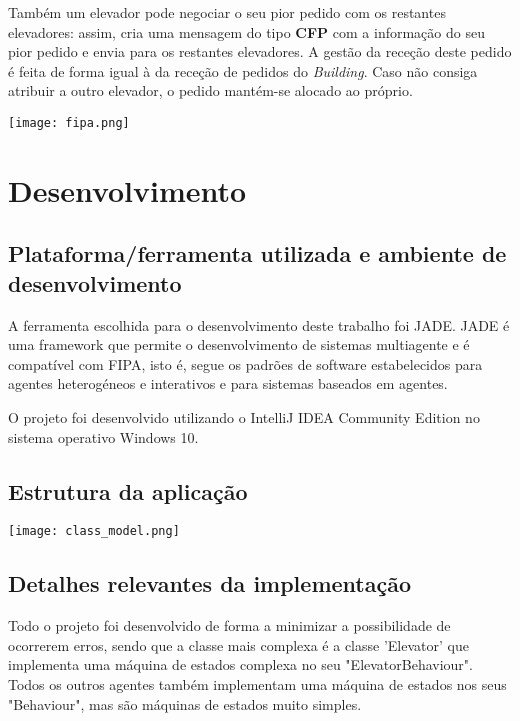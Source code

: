 ﻿\documentclass[a4paper]{article}
\begin{document}
Também um elevador pode negociar o seu pior pedido com os restantes elevadores: assim, cria uma mensagem do tipo \textbf{CFP} com a informação do seu pior pedido e envia para os restantes elevadores. A gestão da receção deste pedido é feita de forma igual à da receção de pedidos do \textit{Building}. Caso não consiga atribuir a outro elevador, o pedido mantém-se alocado ao próprio. 

\begin{center}
	\texttt{[image: fipa.png]}
\end{center}

\newpage

\section{Desenvolvimento}

\subsection{Plataforma/ferramenta utilizada e ambiente de desenvolvimento} 

A ferramenta escolhida para o desenvolvimento deste trabalho foi JADE. JADE é uma framework que permite o desenvolvimento de sistemas multiagente e é compatível com FIPA, isto é, segue os padrões de software estabelecidos para agentes heterogéneos e interativos e para sistemas baseados em agentes.

O projeto foi desenvolvido utilizando o IntelliJ IDEA Community Edition no sistema operativo Windows 10.

\subsection{Estrutura da aplicação} 

\begin{center}
\hspace*{-3.2cm}
	\texttt{[image: class\_model.png]}\linebreak\linebreak
\end{center}

\subsection{Detalhes relevantes da implementação} 

Todo o projeto foi desenvolvido de forma a minimizar a possibilidade de ocorrerem erros, sendo que a classe mais complexa é a classe 'Elevator' que implementa uma máquina de estados complexa no seu "ElevatorBehaviour". Todos os outros agentes também implementam uma máquina de estados nos seus "Behaviour", mas são máquinas de estados muito simples.
\end{document}
